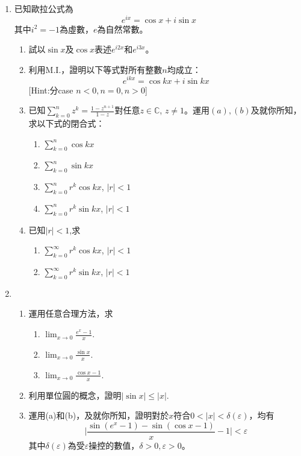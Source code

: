 \documentclass[12pt]{article}
\begin{document}
    \begin{enumerate}
        \item 已知歐拉公式為$$e^{ix}=\cos{x}+i\sin{x}$$其中$i^2=-1$為虛數，$e$為自然常數。\begin{enumerate}
            \item 試以$\sin{x}$及$\cos{x}$表述$e^{i2x}$和$e^{i3x}$。
            \item 利用M.I.，證明以下等式對所有整數$n$均成立：$$e^{ikx}=\cos{kx}+i\sin{kx}$$[Hint:分case $n<0,n=0,n>0$]
            \item 已知$\displaystyle\sum_{k=0}^{n}z^k=\frac{1-z^{n+1}}{1-z}$對任意$z\in\mathbb{C}$, $z\neq 1$。運用$(a),(b)$及就你所知，求以下式的閉合式：\begin{enumerate}
                \item $\displaystyle\sum_{k=0}^{n}\cos{kx}$
                \item $\displaystyle\sum_{k=0}^{n}\sin{kx}$
                \item $\displaystyle\sum_{k=0}^{n}r^k\cos{kx}$, $|r|<1$
                \item $\displaystyle\sum_{k=0}^{n}r^k\sin{kx}$, $|r|<1$
            \end{enumerate}
            \item 已知$|r|<1$,求\begin{enumerate}
                \item $\displaystyle\sum_{k=0}^{\infty}r^k\cos{kx}$, $|r|<1$
                \item $\displaystyle\sum_{k=0}^{\infty}r^k\sin{kx}$, $|r|<1$
            \end{enumerate}
        \end{enumerate}
        \item \begin{enumerate}
            \item 運用任意合理方法，求\begin{enumerate}
                \item $\displaystyle\lim_{x\to 0}\frac{e^x-1}{x}$.
                \item $\displaystyle\lim_{x\to 0}\frac{\sin{x}}{x}$.
                \item $\displaystyle\lim_{x\to 0}\frac{\cos{x}-1}{x}$.
            \end{enumerate}
            \item 利用單位圓的概念，證明$|\sin{x}|\leq |x|$.
            \item 運用(a)和(b)，及就你所知，證明對於$x$符合$0<|x|<\delta(\varepsilon)$，均有$$\biggl|\frac{\sin(e^x-1)-\sin(\cos{x}-1)}{x}-1\biggr|<\varepsilon$$其中$\delta(\varepsilon)$為受$\varepsilon$操控的數值，$\delta>0,\varepsilon>0$。

\end{enumerate}
\end{enumerate}
\end{document}
